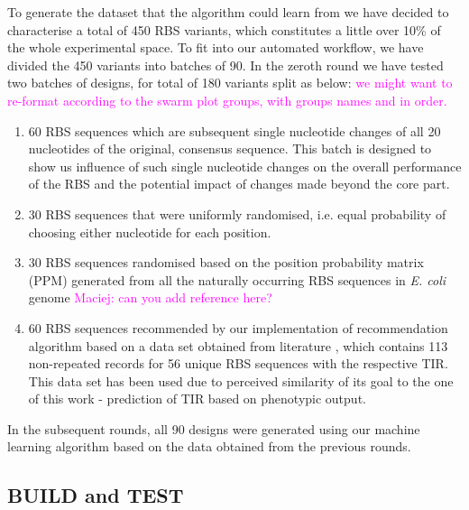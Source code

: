 \documentclass{article}
\newcommand{\mengyan}[1]{\textcolor{magenta}{#1}}
\begin{document}
To generate the dataset that the algorithm could learn from we have decided to characterise a total of 450 RBS variants, which constitutes a little over 10\% of the whole experimental space. 
To fit into our automated workflow, we have divided the 450 variants into batches of 90.
In the zeroth round we have tested two batches of designs, for total of 180 variants split as below: 
\mengyan{we might want to re-format according to the swarm plot groups, with groups names and in order. }

\begin{enumerate}
    \item 60 RBS sequences which are subsequent single nucleotide changes of all 20 nucleotides of the original, consensus sequence. This batch is designed to show us influence of such single nucleotide changes on the overall performance of the RBS and the potential impact of changes made beyond the core part.
    \item 30 RBS sequences that were  uniformly randomised, i.e. equal probability of choosing either nucleotide for each position. 
    \item 30 RBS sequences randomised based on the position probability matrix (PPM) generated from all the naturally occurring RBS sequences in \emph{E. coli} genome \mengyan{Maciej: can you add reference here?}
    \item 60 RBS sequences recommended by our implementation of recommendation algorithm based on a data set obtained from literature \cite{jervis2018machine}, which contains 113 non-repeated records for 56 unique RBS sequences with the respective TIR.
    This data set has been used due to perceived similarity of its goal to the one of this work - prediction of TIR based on phenotypic output.
\end{enumerate}

In the subsequent rounds, all 90 designs were generated using our machine learning algorithm based on the data obtained from the previous rounds. 

\subsection{BUILD and TEST}
\end{document}
